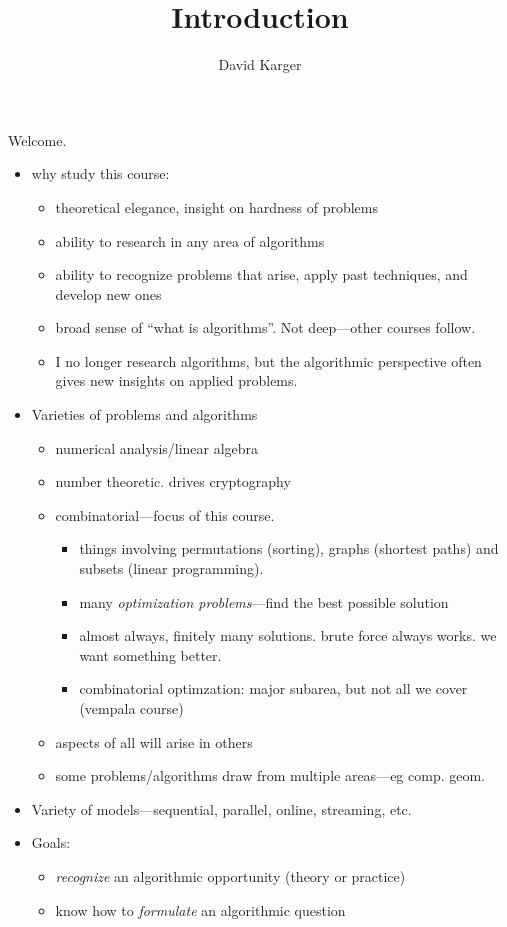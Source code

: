 \documentclass{article}
\title{Introduction}
\author{David Karger}
\begin{document}
Welcome.
\begin{itemize}
\item why study this course:
  \begin{itemize}
  \item theoretical elegance, insight on hardness of problems
  \item ability to research in any area of algorithms
  \item ability to recognize problems that arise, apply past techniques,
    and develop new ones
  \item broad sense of ``what is algorithms''.  Not deep---other
    courses follow.
  \item I no longer research algorithms, but the algorithmic perspective often gives new insights on applied problems.
  \end{itemize}
\item Varieties of problems and algorithms
  \begin{itemize}
  \item numerical analysis/linear algebra
  \item number theoretic.  drives cryptography
  \item combinatorial---focus of this course.
    \begin{itemize}
    \item things involving permutations (sorting), graphs (shortest paths)
      and subsets (linear programming).
    \item many {\em optimization problems}---find the best possible
      solution
    \item almost always, finitely many solutions.  brute force always
      works.  we want something better.
    \item combinatorial optimzation: major subarea, but not all we cover
      (vempala course)
    \end{itemize}
  \item aspects of all will arise in others
  \item some problems/algorithms draw from multiple areas---eg comp. geom.
  \end{itemize}
\item Variety of models---sequential, parallel, online, streaming,
  etc.
\item Goals:
  \begin{itemize}
  \item \emph{recognize} an algorithmic opportunity (theory or practice)
  \item know how to \emph{formulate} an algorithmic question

\end{itemize}
\end{itemize}
\end{document}
